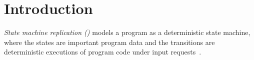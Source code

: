 \section{Introduction} \label{sec:intro}


\emph{State machine replication (\smr)} models a program as a deterministic 
state machine, where the states are important program data and the transitions 
are deterministic executions of program code under input 
requests~\cite{crane:sosp15}.
